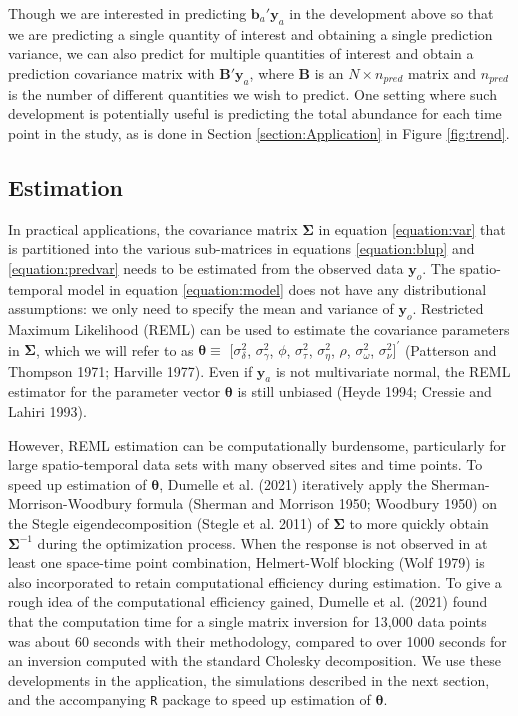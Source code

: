 \documentclass[smallextended]{svjour3}       %
\begin{document}
Though we are interested in predicting \(\mathbf{b}_a ' \mathbf{y}_a\)
in the development above so that we are predicting a single quantity of
interest and obtaining a single prediction variance, we can also predict
for multiple quantities of interest and obtain a prediction covariance
matrix with \(\mathbf{B}' \mathbf{y}_a\), where \(\mathbf{B}\) is an
\(N \times n_{pred}\) matrix and \(n_{pred}\) is the number of different
quantities we wish to predict. One setting where such development is
potentially useful is predicting the total abundance for each time point
in the study, as is done in Section \ref{section:Application} in Figure
\ref{fig:trend}.

\hypertarget{estimation}{%
\subsection{Estimation}\label{estimation}}

In practical applications, the covariance matrix \(\bm{\Sigma}\) in
equation \ref{equation:var} that is partitioned into the various
sub-matrices in equations \ref{equation:blup} and \ref{equation:predvar}
needs to be estimated from the observed data \(\mathbf{y}_o\). The
spatio-temporal model in equation \ref{equation:model} does not have any
distributional assumptions: we only need to specify the mean and
variance of \(\mathbf{y}_o\). Restricted Maximum Likelihood (REML) can
be used to estimate the covariance parameters in \(\bm{\Sigma}\), which
we will refer to as \(\bm{\theta} \equiv\) \([\sigma^2_{\delta}\),
\(\sigma^2_{\gamma}\), \(\phi\), \(\sigma^2_{\tau}\),
\(\sigma^2_{\eta}\), \(\rho\), \(\sigma^2_{\omega}\),
\(\sigma^2_{\nu}]^\prime\) (Patterson and Thompson 1971; Harville 1977).
Even if \(\mathbf{y}_a\) is not multivariate normal, the REML estimator
for the parameter vector \(\bm{\theta}\) is still unbiased (Heyde 1994;
Cressie and Lahiri 1993).

However, REML estimation can be computationally burdensome, particularly
for large spatio-temporal data sets with many observed sites and time
points. To speed up estimation of \(\bm{\theta}\), Dumelle et al. (2021)
iteratively apply the Sherman-Morrison-Woodbury formula (Sherman and
Morrison 1950; Woodbury 1950) on the Stegle eigendecomposition (Stegle
et al. 2011) of \(\bm{\Sigma}\) to more quickly obtain
\(\bm{\Sigma}^{-1}\) during the optimization process. When the response
is not observed in at least one space-time point combination,
Helmert-Wolf blocking (Wolf 1979) is also incorporated to retain
computational efficiency during estimation. To give a rough idea of the
computational efficiency gained, Dumelle et al. (2021) found that the
computation time for a single matrix inversion for 13,000 data points
was about 60 seconds with their methodology, compared to over 1000
seconds for an inversion computed with the standard Cholesky
decomposition. We use these developments in the application, the
simulations described in the next section, and the accompanying
\texttt{R} package to speed up estimation of \(\bm{\theta}\).
\end{document}
